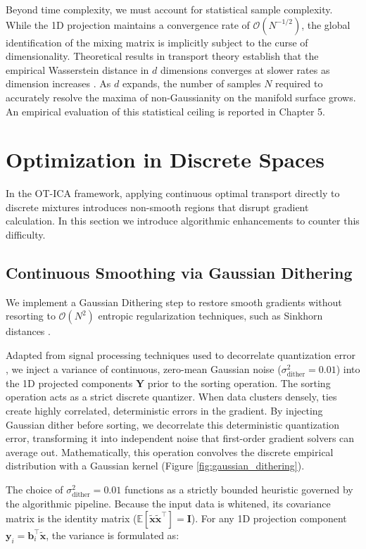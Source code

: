 \documentclass[12pt,a4paper,twoside,openany]{book}
\begin{document}
Beyond time complexity, we must account for statistical sample complexity. While the 1D projection maintains a convergence rate 
of $\mathcal{O}(N^{-1/2})$, the global identification of the mixing matrix is implicitly subject to the curse of dimensionality. 
Theoretical results in transport theory establish 
that the empirical Wasserstein distance in $d$ dimensions converges at slower rates as dimension increases \cite{fournier2015rate}. 
As $d$ expands, the number of samples $N$ required to accurately resolve the maxima of non-Gaussianity on the manifold surface grows. 
An empirical evaluation of this statistical ceiling is reported in Chapter 5.

\section{Optimization in Discrete Spaces}
In the OT-ICA framework, applying continuous optimal transport directly to discrete mixtures introduces non-smooth regions 
that disrupt gradient calculation. In this section we introduce algorithmic enhancements to counter this difficulty.

\subsection{Continuous Smoothing via Gaussian Dithering}
We implement a Gaussian Dithering step to restore smooth gradients without resorting to $\mathcal{O}(N^2)$ entropic regularization techniques, 
such as Sinkhorn distances \cite{cuturi2013sinkhorn}. 

Adapted from signal processing techniques used to decorrelate quantization error \cite{schuchman1964dither}, we inject a variance of continuous, zero-mean Gaussian noise 
($\sigma_{\text{dither}}^2 = 0.01$) into the 1D projected components $\mathbf{Y}$ prior to the sorting operation. 
The sorting operation acts as a strict discrete quantizer. When data clusters densely, ties create highly correlated, deterministic errors in the gradient. 
By injecting Gaussian dither before sorting, we decorrelate this deterministic quantization error, transforming it into independent noise that 
first-order gradient solvers can average out. Mathematically, this operation convolves the discrete empirical distribution with 
a Gaussian kernel (Figure \ref{fig:gaussian_dithering}).

The choice of $\sigma_{\text{dither}}^2 = 0.01$ functions as a strictly bounded heuristic governed by the algorithmic pipeline. 
Because the input data is whitened, its covariance matrix is the identity matrix ($\mathbb{E}[\widetilde{\mathbf{x}}\widetilde{\mathbf{x}}^\top] = \mathbf{I}$). 
For any 1D projection component $\mathbf{y}_i = \mathbf{b}_i^\top \widetilde{\mathbf{x}}$, the variance is formulated as:
\end{document}
